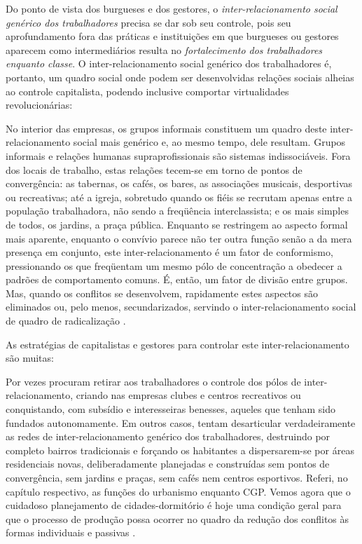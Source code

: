 Do ponto de vista dos burgueses e dos gestores, o \textit{inter-relacionamento social genérico dos trabalhadores} precisa se dar sob seu controle, pois seu aprofundamento fora das práticas e instituições em que burgueses ou gestores aparecem como intermediários resulta no \textit{fortalecimento dos trabalhadores enquanto classe}. O inter-relacionamento social genérico dos trabalhadores é, portanto, um quadro social onde podem ser desenvolvidas relações sociais alheias ao controle capitalista, podendo inclusive comportar virtualidades revolucionárias:

\begin{citacao}
No interior das empresas, os grupos informais constituem um quadro deste inter-relacionamento social mais genérico e, ao mesmo tempo, dele resultam. Grupos informais e relações humanas supraprofissionais são sistemas indissociáveis. Fora dos locais de trabalho, estas relações tecem-se em torno de pontos de convergência: as tabernas, os cafés, os bares, as associações musicais, desportivas ou recreativas; até a igreja, sobretudo quando os fiéis se recrutam apenas entre a população trabalhadora, não sendo a freqüência interclassista; e os mais simples de todos, os jardins, a praça pública. Enquanto se restringem ao aspecto formal mais aparente, enquanto o convívio parece não ter outra função senão a da mera presença em conjunto, este inter-relacionamento é um fator de conformismo, pressionando os que freqüentam um mesmo pólo de concentração a obedecer a padrões de comportamento comuns. É, então, um fator de divisão entre grupos. Mas, quando os conflitos se desenvolvem, rapidamente estes aspectos são eliminados ou, pelo menos, secundarizados, servindo o inter-relacionamento social de quadro de radicalização \cite[p.~329]{BERNARDO1991}.  
\end{citacao}

As estratégias de capitalistas e gestores para controlar este inter-relacionamento são muitas:

\begin{citacao}
Por vezes procuram retirar aos trabalhadores o controle dos pólos de inter-relacionamento, criando nas empresas clubes e centros recreativos ou conquistando, com subsídio e interesseiras benesses, aqueles que tenham sido fundados autonomamente. Em outros casos, tentam desarticular verdadeiramente as redes de inter-relacionamento genérico dos trabalhadores, destruindo por completo bairros tradicionais e forçando os habitantes a dispersarem-se por áreas residenciais novas, deliberadamente planejadas e construídas sem pontos de convergência, sem jardins e praças, sem cafés nem centros esportivos. Referi, no capítulo respectivo, as funções do urbanismo enquanto CGP. Vemos agora que o cuidadoso planejamento de cidades-dormitório é hoje uma condição geral para que o processo de produção possa ocorrer no quadro da redução dos conflitos às formas individuais e passivas \cite[p.~330]{BERNARDO1991}.  
\end{citacao}

